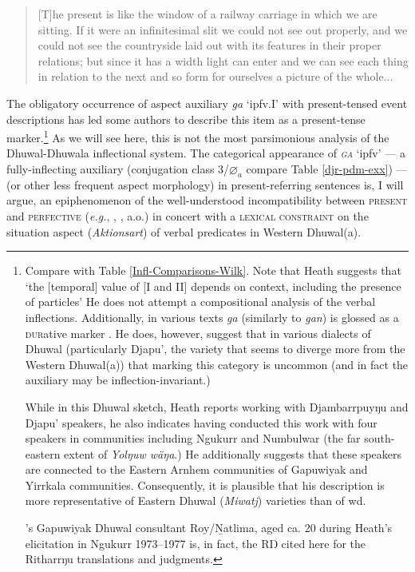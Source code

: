 \begin{quote}\small
	[T]he present is like the window of a railway carriage in which we are sitting. If it were an infinitesimal slit we could not see out properly, and we could not see the countryside laid out with its features in their proper relations; but since it has a width light can enter and we can see each thing in relation to the next and so form for ourselves a picture of the whole...\hfill{\citep[325]{Hamblin1972}}
\end{quote}



\noindent The obligatory occurrence of aspect auxiliary \textit{ga} `\gls{ipfv}.\gls{I}' with present-tensed event descriptions has led some authors \citep[\textit{e.g.},][46]{Heath1980} to describe this item as a present-tense marker.\footnote{Compare with Table \ref{Infl-Comparisons-Wilk}. Note that Heath suggests that `the [temporal] value of [\gls{I} and \gls{II}] depends on context, including the presence of particles' \citeyearpar[38]{Heath1980} He does not attempt a compositional analysis of the verbal inflections. Additionally, in various texts \textit{ga} (similarly to \textit{gan}) is glossed as a \textsc{dur}ative marker \citeyearpar[\textit{e.g.},][183, see also 46]{Heath1980}. He does, however, suggest that in various dialects of Dhuwal (particularly Djapu', the variety that seems to diverge more from the Western Dhuwal(a)) that marking this category is uncommon (and in fact the auxiliary may be inflection-invariant.)
	
	While in this Dhuwal sketch, Heath reports working with Djambarrpuyŋu and Djapu' speakers, he also indicates having conducted this work with four speakers in communities including Ngukurr and Numbulwar (the far south-eastern extent of \textit{Yolŋuw wäŋa}.) He additionally suggests that these speakers are connected to the Eastern Arnhem communities of Gapuwiyak and Yirrkala communities. Consequently, it is plausible that his description is more representative of Eastern Dhuwal (\textit{Miwatj}) varieties than of \gls{wd}.

\citeauthor{Heath1980}'s Gapuwiyak Dhuwal consultant Roy/Ṉatlima, aged ca. 20 during Heath's elicitation in Ngukurr 1973--1977 is, in fact, the RŊ cited here for the Ritharrŋu translations and judgments.

} As we will see here, this is not the most parsimonious analysis of the Dhuwal-Dhuwala inflectional system. The categorical appearance of \textit{\textsc{ga}} `\gls{ipfv}' --- a fully-inflecting auxiliary (conjugation class 3/$ \varnothing_a $ compare Table \ref{djr-pdm-exx}) --- (or other less frequent aspect morphology) in present-referring sentences is, I will argue, an epiphenomenon of the well-understood incompatibility between \textsc{present} and \textsc{perfective} (\textit{e.g.}, \citealp[66\textit{ff}]{Comrie1976}, \citealp[110]{Smith1997}, \citealp{Malchukov2009,Schaden2011,DeWit2016} a.o.) in concert with a \textsc{lexical constraint} on the situation aspect (\textit{Aktionsart}) of verbal predicates in Western Dhuwal(a).

